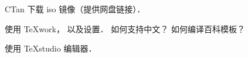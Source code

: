 
\begin{issues}
\issueTODO
\end{issues}

CTan 下载 iso 镜像（提供网盘链接）．

使用 TeXwork， 以及设置． 如何支持中文？ 如何编译百科模板？

使用 TeXstudio 编辑器．
